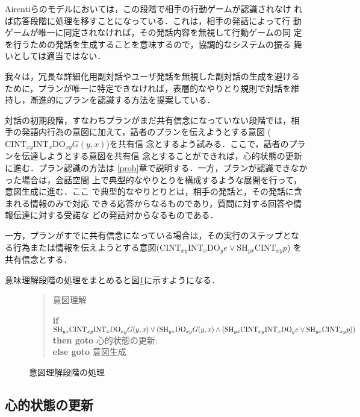 Airentiらのモデルにおいては，この段階で相手の行動ゲームが認識されなけ
れば応答段階に処理を移すことになっている．これは，相手の発話によって行
動ゲームが唯一に同定されなければ，その発話内容を無視して行動ゲームの同
定を行うための発話を生成することを意味するので，協調的なシステムの振る
舞いとしては適当ではない．

我々は，冗長な詳細化用副対話やユーザ発話を無視した副対話の生成を避ける
ために，プランが唯一に特定できなければ，表層的なやりとり規則で対話を維
持し，漸進的にプランを認識する方法を提案している\cite{araki95a}．

対話の初期段階，すなわちプランがまだ共有信念になっていない段階では，相
手の発語内行為の意図に加えて，話者のプランを伝えようとする意図
($\mbox{CINT}_{xy} \mbox{INT}_x \mbox{DO}_{xy} G(y,x)$)を共有信
念とするよう試みる．ここで，話者のプランを伝達しようとする意図を共有信
念とすることが\mbox{できれば}，心的状態の更新に進む．プラン認識の方法は
\ref{prob}章で説明する．一方，\mbox{プランが認識で}きなかった場合は，会話空間
上で典型的なやりとりを構成するような展開を行って，意図生成に進む．ここ
で典型的なやりとりとは，相手の発話と，その発話に含まれる情報のみで対応
できる応答からなるものであり，質問に対する回答や情報伝達に対する受諾な
どの発話対からなるものである．

一方，プランがすでに共有信念になっている場合は，その実行のステップとな
る行為または情報を伝えようとする意図($\mbox{CINT}_{xy} \mbox{INT}_x
\mbox{DO}_{y} e \lor \mbox{SH}_{yx}\mbox{CINT}_{xy} p$)
を共有信念とする．

意味理解段階の処理をまとめると図\ref{step2}に示すようになる．

\begin{figure}[htbp]
\begin{quote}
\noindent
{\dg 意図理解}

\noindent
{\bf if} $\mbox{SH}_{yx}\mbox{CINT}_{xy} \mbox{INT}_x
\mbox{DO}_{xy} G(y,x)\\
\lor (\mbox{SH}_{yx} \mbox{DO}_{xy} G(y,x) \land
(\mbox{SH}_{yx} \mbox{CINT}_{xy} \mbox{INT}_x \mbox{DO}_{y} e
\lor \mbox{SH}_{yx}\mbox{CINT}_{xy} p))$\\
{\bf then goto} 心的状態の更新;\\
{\bf else goto} 意図生成
\end{quote}

\caption{意図理解段階の処理}
\label{step2}
\end{figure}

\subsection{心的状態の更新}

